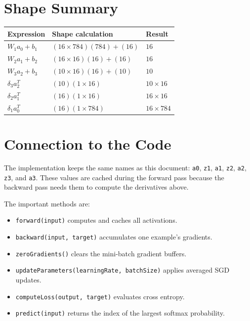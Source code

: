 \documentclass[11pt]{article}
\begin{document}
\section{Shape Summary}

\begin{center}
\begin{tabular}{lll}
\toprule
Expression & Shape calculation & Result \\
\midrule
$W_1 a_0 + b_1$ & $(16 \times 784)(784) + (16)$ & $16$ \\
$W_2 a_1 + b_2$ & $(16 \times 16)(16) + (16)$ & $16$ \\
$W_3 a_2 + b_3$ & $(10 \times 16)(16) + (10)$ & $10$ \\
$\delta_3 a_2^T$ & $(10)(1 \times 16)$ & $10 \times 16$ \\
$\delta_2 a_1^T$ & $(16)(1 \times 16)$ & $16 \times 16$ \\
$\delta_1 a_0^T$ & $(16)(1 \times 784)$ & $16 \times 784$ \\
\bottomrule
\end{tabular}
\end{center}

\section{Connection to the Code}

The implementation keeps the same names as this document:
\texttt{a0}, \texttt{z1}, \texttt{a1}, \texttt{z2}, \texttt{a2}, \texttt{z3},
and \texttt{a3}. These values are cached during the forward pass because the
backward pass needs them to compute the derivatives above.

The important methods are:
\begin{itemize}
    \item \texttt{forward(input)} computes and caches all activations.
    \item \texttt{backward(input, target)} accumulates one example's gradients.
    \item \texttt{zeroGradients()} clears the mini-batch gradient buffers.
    \item \texttt{updateParameters(learningRate, batchSize)} applies averaged
          SGD updates.
    \item \texttt{computeLoss(output, target)} evaluates cross entropy.
    \item \texttt{predict(input)} returns the index of the largest softmax
          probability.
\end{itemize}
\end{document}
